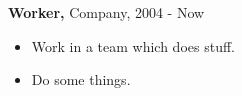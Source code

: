 {{\bf Worker,} Company}, 2004 - Now
\begin{itemize}
\item Work in a team which does stuff.
\item Do some things.
\end{itemize}